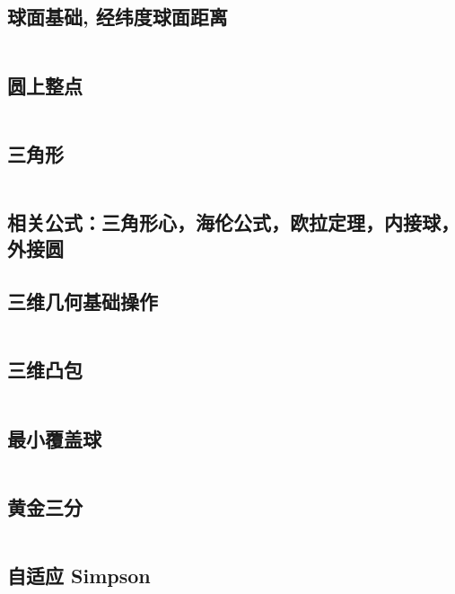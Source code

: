 				\subsection{球面基础, 经纬度球面距离}
				\begin{small}
					
				\end{small}
					\inputminted{cpp}{src/Geometry/经纬度求球面最短距离.cpp}
				\subsection{圆上整点}
					\inputminted{cpp}{src/Geometry/圆上整点.cpp}
				\subsection{三角形}
				\inputminted{cpp}{src/Geometry/三角形.cpp}
				\subsection{相关公式：三角形心，海伦公式，欧拉定理，内接球，外接圆}
					
				\subsection{三维几何基础操作}
					\inputminted{cpp}{src/Geometry/三维几何.cpp}
				\subsection{三维凸包}
					\inputminted{cpp}{src/Geometry/三维凸包.cpp}
				\subsection{最小覆盖球}
					\inputminted{cpp}{src/Geometry/最小覆盖球.cpp}
\subsection{黄金三分}
					\inputminted[highlightlines={7}]{cpp}{src/yzh/golden_ternary.cpp}
\subsection{自适应 Simpson}
					\inputminted{cpp}{src/Math/Simpson.cpp}
